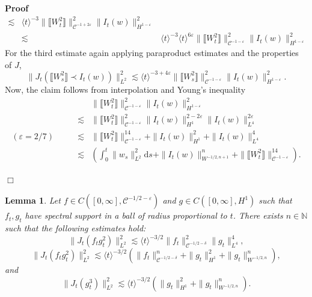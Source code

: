 \documentclass[11pt]{article}
\newcommand{\mathd}{\mathrm{d}}
\newenvironment{proof}{\noindent\textbf{Proof\ }}{\hspace*{\fill}$\Box$\medskip}
\newtheorem{lemma}{Lemma}
\newcommand{\VV}{\mathscr{C}}
\begin{document}
\begin{proof}
\[\begin{array}{lll}
       \lesssim & \langle t \rangle^{- 3} \| \llbracket W_t^2 \rrbracket
       \|^2_{\VV^{- 1 + 2 \varepsilon}} \| I_t (w) \|^2_{H^{1 -
       \varepsilon}}\\
       & \lesssim & \langle t \rangle^{- 3} \langle t \rangle^{6 \varepsilon}
       \| \llbracket W_t^2 \rrbracket \|^2_{\VV^{- 1 - \varepsilon}} \| I_t
       (w) \|^2_{H^{1 - \varepsilon}}
     \end{array} \]
  For the third estimate again applying paraproduct estimates and the
  properties of $J$,
  \[ \| J_t (\llbracket W_s^2 \rrbracket \prec I_t (w)) \|^2_{L^2} \lesssim
     \langle t \rangle^{- 3 + 4 \varepsilon} \| \llbracket W_s^2 \rrbracket
     \|^2_{\VV^{- 1 - \varepsilon}} \| I_t (w) \|^2_{H^{1 - \varepsilon}} . \]
  Now, the claim follows from interpolation and Young's inequality
  \begin{eqnarray*}
    &  & \| \llbracket W_t^2 \rrbracket \|^2_{\VV^{- 1 - \varepsilon}} \| I_t
    (w) \|^2_{H^{1 - \varepsilon}}\\
    & \lesssim & \| \llbracket W_t^2 \rrbracket \|^2_{\VV^{- 1 -
    \varepsilon}} \| I_t (w) \|^{2 - 2 \varepsilon}_{H^1} \| I_t (w) \|^{2
    \varepsilon}_{L^4}\\
    \scriptstyle{(\varepsilon = 2 / 7)} \qquad & \lesssim & \| \llbracket W_t^2
    \rrbracket \|^{14}_{\VV^{- 1 - \varepsilon}} + \| I_t (w) \|^2_{H^1} + \|
    I_t (w) \|^4_{L^4}\\
    & \lesssim & \left( \int^t_0 \| w_s \|_{L^2}^2 \mathd s + \| I_t (w)
    \|^n_{W^{- 1 / 2, n + 1}} + \| \llbracket W_t^2 \rrbracket \|^{14}_{\VV^{-
    1 - \varepsilon}} \right) .
  \end{eqnarray*}
  
\end{proof}

\begin{lemma}
  \label{analyticestimate2}Let $f \in C \left( [0, \infty], \VV^{- 1 / 2 -
  \varepsilon} \right)$ and $g \in C ([0, \infty], H^1)$ such that $f_t, g_t$
  have spectral support in a ball of radius proportional to $t$. There exists
  $n \in \mathbb{N}$ such that the following estimates hold:
  \[ \| J_t (f_t g_t^2) \|^2_{L^2} \lesssim \langle t \rangle^{- 3 / 2} \| f_t
     \|_{\VV^{- 1 / 2 - \delta}}^2 \| g_t \|^4_{L^4}, \]
  \[ \| J_t (f_t g_t^2) \|^2_{L^2} \lesssim \langle t \rangle^{- 3 / 2} \left(
     \| f_t \|^n_{\VV^{- 1 / 2 - \delta}} + \| g_t \|^2_{H^1} + \| g_t
     \|_{W^{- 1 / 2, n}}^n \right), \]
  and
  \[ \| J_t (g_t^3) \|^2_{L^2} \lesssim \langle t \rangle^{- 3 / 2} (\| g_t
     \|_{H^1}^2 + \| g_t \|_{W^{- 1 / 2, n}}^n) . \]
\end{lemma}
\end{document}
